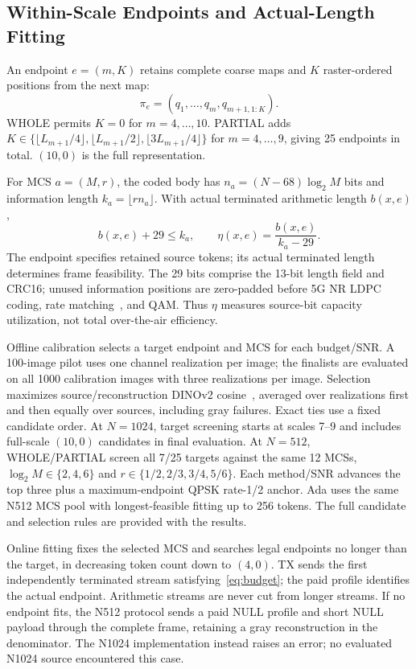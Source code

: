 \subsection{Within-Scale Endpoints and Actual-Length Fitting}
An endpoint $e=(m,K)$ retains complete coarse maps and $K$ raster-ordered positions from the next map:
\begin{equation}
 \pi_e=(q_1,\ldots,q_m,q_{m+1,1:K}).
 \label{eq:prefix}
\end{equation}
WHOLE permits $K=0$ for $m=4,\ldots,10$. PARTIAL adds
$K\in\{\lfloor L_{m+1}/4\rfloor,\allowbreak\lfloor L_{m+1}/2\rfloor,\allowbreak\lfloor3L_{m+1}/4\rfloor\}$ for $m=4,\ldots,9$, giving 25 endpoints in total. $(10,0)$ is the full representation.

For MCS $a=(M,r)$, the coded body has $n_a=(N-68)\log_2M$ bits and information length $k_a=\lfloor rn_a\rfloor$. With actual terminated arithmetic length $b(x,e)$,
\begin{equation}
 b(x,e)+29\leq k_a,\qquad \eta(x,e)=\frac{b(x,e)}{k_a-29}.
 \label{eq:budget}
\end{equation}
The endpoint specifies retained source tokens; its actual terminated length determines frame feasibility. The 29 bits comprise the 13-bit length field and CRC16; unused information positions are zero-padded before 5G NR LDPC coding, rate matching~\cite{nr}, and QAM. Thus $\eta$ measures source-bit capacity utilization, not total over-the-air efficiency.

Offline calibration selects a target endpoint and MCS for each budget/SNR. A 100-image pilot uses one channel realization per image; the finalists are evaluated on all 1000 calibration images with three realizations per image. Selection maximizes source/reconstruction DINOv2 cosine~\cite{dinov2}, averaged over realizations first and then equally over sources, including gray failures. Exact ties use a fixed candidate order. At $N=1024$, target screening starts at scales 7--9 and includes full-scale $(10,0)$ candidates in final evaluation. At $N=512$, WHOLE/PARTIAL screen all 7/25 targets against the same 12 MCSs, $\log_2M\in\{2,4,6\}$ and $r\in\{1/2,2/3,3/4,5/6\}$. Each method/SNR advances the top three plus a maximum-endpoint QPSK rate-1/2 anchor. Ada uses the same N512 MCS pool with longest-feasible fitting up to 256 tokens. The full candidate and selection rules are provided with the results.

Online fitting fixes the selected MCS and searches legal endpoints no longer than the target, in decreasing token count down to $(4,0)$. TX sends the first independently terminated stream satisfying~\eqref{eq:budget}; the paid profile identifies the actual endpoint. Arithmetic streams are never cut from longer streams. If no endpoint fits, the N512 protocol sends a paid NULL profile and short NULL payload through the complete frame, retaining a gray reconstruction in the denominator. The N1024 implementation instead raises an error; no evaluated N1024 source encountered this case.

